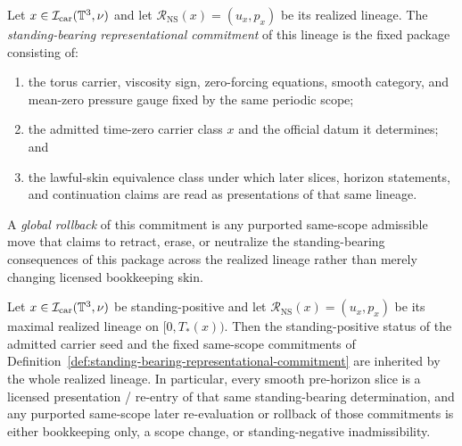 \begin{definition}\label{def:standing-bearing-representational-commitment}
Let $x\in\mathcal I_{\mathrm{car}}(\mathbb{T}^3,\nu)$ and let $\mathcal R_{\mathrm{NS}}(x)=(u_x,p_x)$ be its realized lineage. The \emph{standing-bearing representational commitment} of this lineage is the fixed package consisting of:
\begin{enumerate}[label=(\roman*), leftmargin=2.2em]
\item the torus carrier, viscosity sign, zero-forcing equations, smooth category, and mean-zero pressure gauge fixed by the same periodic scope;
\item the admitted time-zero carrier class $x$ and the official datum it determines; and
\item the lawful-skin equivalence class under which later slices, horizon statements, and continuation claims are read as presentations of that same lineage.
\end{enumerate}
A \emph{global rollback} of this commitment is any purported same-scope admissible move that claims to retract, erase, or neutralize the standing-bearing consequences of this package across the realized lineage rather than merely changing licensed bookkeeping skin.
\end{definition}

\begin{manualproposition}
\label{prop:standing-commitment-inheritance-realized-lineages}
Let $x\in\mathcal I_{\mathrm{car}}(\mathbb{T}^3,\nu)$ be standing-positive and let $\mathcal R_{\mathrm{NS}}(x)=(u_x,p_x)$ be its maximal realized lineage on $[0,T_*(x))$. Then the standing-positive status of the admitted carrier seed and the fixed same-scope commitments of Definition~\ref{def:standing-bearing-representational-commitment} are inherited by the whole realized lineage. In particular, every smooth pre-horizon slice is a licensed presentation / re-entry of that same standing-bearing determination, and any purported same-scope later re-evaluation or rollback of those commitments is either bookkeeping only, a scope change, or standing-negative inadmissibility.
\end{manualproposition}

